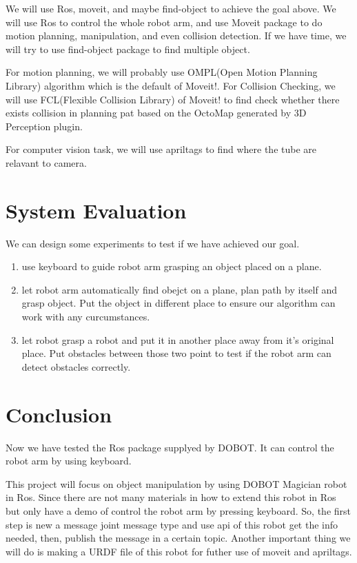 \documentclass[10pt,twocolumn,letterpaper]{article}
\begin{document}
We will use Ros, moveit, and maybe find-object to achieve the goal above. We will use Ros to control the whole robot arm, and use Moveit package to do motion planning, manipulation, and even collision detection. If we have time, we will try to use find-object package to find multiple object.

For motion planning, we will probably use OMPL(Open Motion Planning Library) algorithm which is the default of Moveit!. For Collision Checking, we will use FCL(Flexible Collision Library) of Moveit! to find check whether there exists collision in planning pat based on the OctoMap generated by 3D Perception plugin.

For computer vision task,  we will use apriltags to find where the tube are relavant to camera.



\section{System	Evaluation}

We can design some experiments to test if we have achieved our goal.

\begin{enumerate}
\item use keyboard to guide robot arm grasping an object placed on a plane.
\item let robot arm automatically find obejct on a plane, plan path by itself and grasp object. Put the object in different place to ensure our algorithm can work with any curcumstances.
\item let robot grasp a robot and put it in another place away from it's original place. Put obstacles between those two point to test if the robot arm can detect obstacles correctly.
\end{enumerate}


\section{Conclusion}

Now we have tested the Ros package supplyed by DOBOT. It can control the robot arm by using keyboard. 

This project will focus on object manipulation by using DOBOT Magician robot in Ros. Since there are not many materials in how to extend this robot in Ros but only have a demo of control the robot arm by pressing keyboard. So, the first step is new a message joint message type and use api of this robot get the info needed, then, publish the message in a certain topic.  Another important thing we will do is making a URDF file of this robot for futher use of moveit and apriltags. 




{


}
\end{document}
